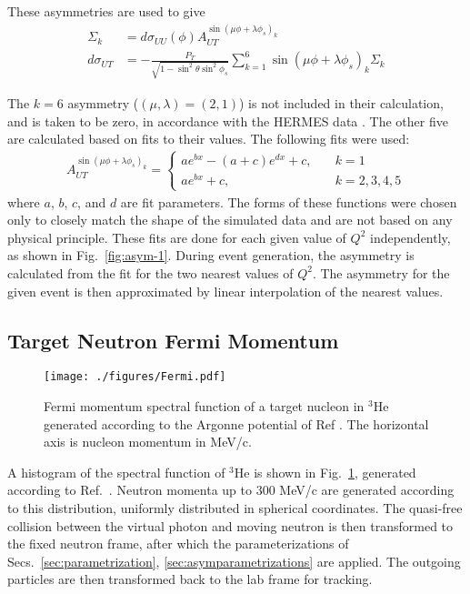 These asymmetries are used to give
\begin{align}
  \Sigma_k &= d\sigma_{UU}(\phi)A_{UT}^{\sin(\mu\phi+\lambda\phi_s)_k} \\
  d\sigma_{UT}&=-\frac{P_T}{\sqrt{1-\sin^2\theta
      \sin^2\phi_s}}\sum_{k=1}^{6}\sin(\mu\phi+\lambda\phi_s)_k\Sigma_k
\end{align}

The $k=6$ asymmetry ($(\mu,\lambda)=(2,1)$) is not included in their
calculation, and is taken to be zero, in accordance with the HERMES data
\cite{hermes-thesis}. The other five are calculated based on fits to their
values.  The following fits were used:
\begin{align}
  A_{UT}^{\sin(\mu\phi+\lambda\phi_s)_k} =
  \begin{cases}
    ae^{bx}-(a+c)e^{dx}+c, &\quad k=1 \\
    ae^{bx}+c, &\quad k=2,3,4,5
  \end{cases}
\end{align}
where $a$, $b$, $c$, and $d$ are fit parameters. The forms of these functions
were chosen only to closely match the shape of the simulated data and are not
based on any physical principle. These fits are done for each given value of
$Q^2$ independently, as shown in Fig.~\ref{fig:asym-1}.  During event
generation, the asymmetry is calculated from the fit for the two nearest values
of $Q^2$. The asymmetry for the given event is then approximated by linear
interpolation of the nearest values.

\subsection{Target Neutron Fermi Momentum 
\label{sec:fermimotion}}

\begin{figure}[!hbt]
    \centering
    \texttt{[image: ./figures/Fermi.pdf]}
    \caption{Fermi momentum spectral function of a target nucleon in $^3$He
      generated according to the Argonne potential of Ref \cite{fermipaper}.
      The horizontal axis is nucleon momentum in MeV/c.}
    \label{fig:fermi}
\end{figure}

A histogram of the spectral function of $^3$He is shown in
Fig.~\ref{fig:fermi}, generated according to Ref.~\cite{fermipaper}. Neutron
momenta up to 300 MeV/c are generated according to this distribution, uniformly
distributed in spherical coordinates. The quasi-free collision between the
virtual photon and moving neutron is then transformed to the fixed neutron
frame, after which the parameterizations of Secs.~\ref{sec:parametrization},
\ref{sec:asymparametrizations} are applied. The outgoing particles are then
transformed back to the lab frame for tracking.

